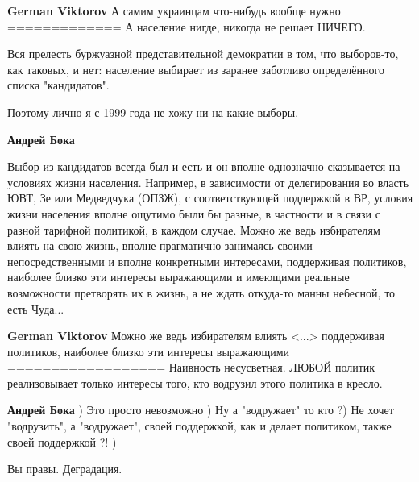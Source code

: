 \begin{itemize}
\begin{itemize}
\textbf{German Viktorov} А самим украинцам что-нибудь вообще нужно
=============
А население нигде, никогда не решает НИЧЕГО.

Вся прелесть буржуазной представительной демократии в том, что выборов-то, как
таковых, и нет: население выбирает из заранее заботливо определённого списка
"кандидатов".

Поэтому лично я с 1999 года не хожу ни на какие выборы.

\textbf{Андрей Бока} 

Выбор из кандидатов всегда был и есть и он вполне однозначно сказывается на
условиях жизни населения. Например, в зависимости от делегирования во власть
ЮВТ, Зе или Медведчука (ОПЗЖ), с соответствующей поддержкой в ВР, условия жизни
населения вполне ощутимо были бы разные, в частности и в связи с разной
тарифной политикой, в каждом случае. Можно же ведь избирателям влиять на свою
жизнь, вполне прагматично занимаясь своими непосредственными и вполне
конкретными интересами, поддерживая политиков, наиболее близко эти интересы
выражающими и имеющими реальные возможности претворять их в жизнь, а не ждать
откуда-то манны небесной, то есть Чуда...

\textbf{German Viktorov} Можно же ведь избирателям влиять <...> поддерживая политиков, наиболее близко эти интересы выражающими
==================
Наивность несусветная.
ЛЮБОЙ политик реализовывает только интересы того, кто водрузил этого политика в кресло.

\textbf{Андрей Бока} ) Это просто невозможно ) Ну а "водружает" то кто ?) Не хочет "водрузить", а "водружает", своей поддержкой, как и делает политиком, также своей поддержкой ?! )

\end{itemize} %

Вы правы. Деградация.

\end{itemize} %
